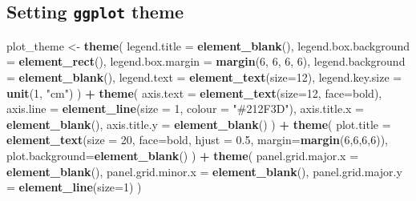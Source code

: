 \documentclass[
]{book}
\newenvironment{Shaded}{\begin{snugshade}}{\end{snugshade}}
\newcommand{\DataTypeTok}[1]{\textcolor[rgb]{0.13,0.29,0.53}{#1}}
\newcommand{\DecValTok}[1]{\textcolor[rgb]{0.00,0.00,0.81}{#1}}
\newcommand{\FloatTok}[1]{\textcolor[rgb]{0.00,0.00,0.81}{#1}}
\newcommand{\KeywordTok}[1]{\textcolor[rgb]{0.13,0.29,0.53}{\textbf{#1}}}
\newcommand{\NormalTok}[1]{#1}
\newcommand{\OperatorTok}[1]{\textcolor[rgb]{0.81,0.36,0.00}{\textbf{#1}}}
\newcommand{\StringTok}[1]{\textcolor[rgb]{0.31,0.60,0.02}{#1}}
\begin{document}
\hypertarget{setting-ggplot-theme}{%
\subsection{\texorpdfstring{Setting \texttt{ggplot} theme}{Setting ggplot theme}}\label{setting-ggplot-theme}}

\begin{Shaded}
\begin{Highlighting}[]
\NormalTok{plot\_theme \textless{}{-}}\StringTok{ }
\StringTok{  }\KeywordTok{theme}\NormalTok{(}
    \DataTypeTok{legend.title =} \KeywordTok{element\_blank}\NormalTok{(),}
    \DataTypeTok{legend.box.background =} \KeywordTok{element\_rect}\NormalTok{(),}
    \DataTypeTok{legend.box.margin =} \KeywordTok{margin}\NormalTok{(}\DecValTok{6}\NormalTok{, }\DecValTok{6}\NormalTok{, }\DecValTok{6}\NormalTok{, }\DecValTok{6}\NormalTok{),}
    \DataTypeTok{legend.background =} \KeywordTok{element\_blank}\NormalTok{(),}
    \DataTypeTok{legend.text =} \KeywordTok{element\_text}\NormalTok{(}\DataTypeTok{size=}\DecValTok{12}\NormalTok{),}
    \DataTypeTok{legend.key.size =} \KeywordTok{unit}\NormalTok{(}\DecValTok{1}\NormalTok{, }\StringTok{"cm"}\NormalTok{)}
\NormalTok{  ) }\OperatorTok{+}\StringTok{ }
\StringTok{  }\KeywordTok{theme}\NormalTok{(}
    \DataTypeTok{axis.text =} \KeywordTok{element\_text}\NormalTok{(}\DataTypeTok{size=}\DecValTok{12}\NormalTok{, }\DataTypeTok{face=}\StringTok{\textquotesingle{}bold\textquotesingle{}}\NormalTok{),}
    \DataTypeTok{axis.line =} \KeywordTok{element\_line}\NormalTok{(}\DataTypeTok{size =} \DecValTok{1}\NormalTok{, }\DataTypeTok{colour =} \StringTok{"\#212F3D"}\NormalTok{),}
    \DataTypeTok{axis.title.x =} \KeywordTok{element\_blank}\NormalTok{(),}
    \DataTypeTok{axis.title.y =} \KeywordTok{element\_blank}\NormalTok{()}
\NormalTok{  ) }\OperatorTok{+}\StringTok{ }
\StringTok{  }\KeywordTok{theme}\NormalTok{(}
    \DataTypeTok{plot.title =} \KeywordTok{element\_text}\NormalTok{(}\DataTypeTok{size =} \DecValTok{20}\NormalTok{, }\DataTypeTok{face=}\StringTok{\textquotesingle{}bold\textquotesingle{}}\NormalTok{, }\DataTypeTok{hjust =} \FloatTok{0.5}\NormalTok{, }\DataTypeTok{margin=}\KeywordTok{margin}\NormalTok{(}\DecValTok{6}\NormalTok{,}\DecValTok{6}\NormalTok{,}\DecValTok{6}\NormalTok{,}\DecValTok{6}\NormalTok{)),}
    \DataTypeTok{plot.background=}\KeywordTok{element\_blank}\NormalTok{() }
\NormalTok{  ) }\OperatorTok{+}
\StringTok{  }\KeywordTok{theme}\NormalTok{(}
    \DataTypeTok{panel.grid.major.x =} \KeywordTok{element\_blank}\NormalTok{(),}
    \DataTypeTok{panel.grid.minor.x =} \KeywordTok{element\_blank}\NormalTok{(),}
    \DataTypeTok{panel.grid.major.y =} \KeywordTok{element\_line}\NormalTok{(}\DataTypeTok{size=}\DecValTok{1}\NormalTok{)}
\NormalTok{  )}
\end{Highlighting}
\end{Shaded}
\end{document}
